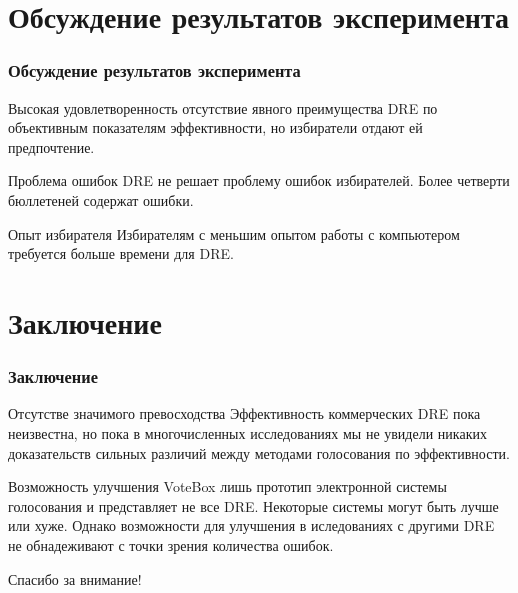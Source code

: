 \documentclass[11pt]{beamer}
\begin{document}
\section{Обсуждение результатов эксперимента}

\begin{frame}
\frametitle{Обсуждение результатов эксперимента}
    \begin{block}{Высокая удовлетворенность}
        \alert{отсутствие явного преимущества DRE} по объективным показателям эффективности, но избиратели отдают ей предпочтение.
    \end{block}
    
    \begin{block}{Проблема ошибок}
        \alert{DRE не решает проблему ошибок избирателей}. Более четверти бюллетеней содержат ошибки.
    \end{block}
    
    \begin{block}{Опыт избирателя}
        Избирателям с меньшим опытом работы с компьютером требуется больше времени для DRE.
    \end{block}
\end{frame}

\section{Заключение}

\begin{frame}
\frametitle{Заключение}
    \begin{block}{Отсутстве значимого превосходства}
        Эффективность коммерческих DRE пока неизвестна, но пока в многочисленных исследованиях \alert{мы не увидели никаких доказательств} сильных различий между методами голосования по эффективности.
    \end{block}
    
    \begin{block}{Возможность улучшения}
        VoteBox лишь прототип электронной системы голосования и представляет не все DRE. Некоторые системы могут быть \alert{лучше} или \alert{хуже}. Однако возможности для улучшения в иследованиях с другими DRE \alert{не обнадеживают} с точки зрения количества ошибок. 
    \end{block}
\end{frame}

\begin{frame}
    \centering
    \Huge{\Huge\calligra Спасибо за внимание!}
\end{frame}
\end{document}
